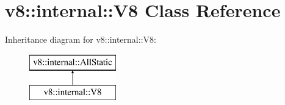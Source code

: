 \hypertarget{classv8_1_1internal_1_1_v8}{}\section{v8\+:\+:internal\+:\+:V8 Class Reference}
\label{classv8_1_1internal_1_1_v8}
Inheritance diagram for v8\+:\+:internal\+:\+:V8\+:\begin{figure}[H]
\begin{center}
\leavevmode
\includegraphics[height=2.000000cm]{classv8_1_1internal_1_1_v8}
\end{center}
\end{figure}
